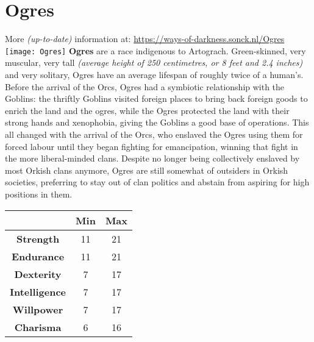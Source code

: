 \section{Ogres}
More \textit{(up-to-date)} information at: \url{https://ways-of-darkness.sonck.nl/Ogres}\newline
\texttt{[image: Ogres]}\newline
\textbf{Ogres} are a race indigenous to Artograch. Green-skinned, very muscular, very tall \textit{(average height of 250 centimetres, or 8 feet and 2.4 inches)} and very solitary, Ogres have an average lifespan of roughly twice of a human's. Before the arrival of the Orcs, Ogres had a symbiotic relationship with the Goblins: the thriftly Goblins visited foreign places to bring back foreign goods to enrich the land and the ogres, while the Ogres protected the land with their strong hands and xenophobia, giving the Goblins a good base of operations. This all changed with the arrival of the Orcs, who enslaved the Ogres using them for forced labour until they began fighting for emancipation, winning that fight in the more liberal-minded clans. Despite no longer being collectively enslaved by most Orkish clans anymore, Ogres are still somewhat of outsiders in Orkish societies, preferring to stay out of clan politics and abstain from aspiring for high positions in them.\newline
\begin{tabular}{|c|c|c|}
\hline
 & \textbf{Min} & \textbf{Max} \\ \hline
\textbf{Strength} & 11 & 21 \\ \hline
\textbf{Endurance} & 11 & 21 \\ \hline
\textbf{Dexterity} & 7 & 17 \\ \hline
\textbf{Intelligence} & 7 & 17 \\ \hline
\textbf{Willpower} & 7 & 17 \\ \hline
\textbf{Charisma} & 6 & 16 \\ \hline
\end{tabular}\newline
{}\newpage
